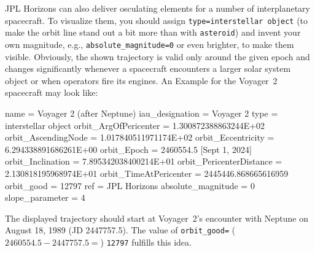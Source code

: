 \noindent JPL Horizons can also deliver osculating elements for a number of interplanetary spacecraft. 
To visualize them, you should assign \texttt{type=interstellar object} 
(to make the orbit line stand out a bit more than with \texttt{asteroid}) 
and invent your own magnitude, e.g., \texttt{absolute\_magnitude=0} or even brighter, to make them visible. 
Obviously, the shown trajectory is valid only around the given epoch and changes significantly whenever a spacecraft 
encounters a larger solar system object or when operators fire its engines. An Example for the Voyager~2 spacecraft may look like:

\begin{configfile}[\scriptsize]
[voyager2]
name                           = Voyager 2 (after Neptune)
iau_designation                = Voyager 2
type                           = interstellar object
orbit_ArgOfPericenter          = 1.300872388863244E+02
orbit_AscendingNode            = 1.017840511971174E+02
orbit_Eccentricity             = 6.294338891686261E+00
orbit_Epoch                    = 2460554.5               [Sept 1, 2024]
orbit_Inclination              = 7.895342038400214E+01
orbit_PericenterDistance       = 2.130818195968974E+01
orbit_TimeAtPericenter         = 2445446.868665616959
orbit_good                     = 12797
ref                            = JPL Horizons 
absolute_magnitude             = 0
slope_parameter                = 4
\end{configfile}

\noindent The displayed trajectory should start at Voyager~2's encounter with Neptune on August 18, 1989 (JD 2447757.5). 
The value of \texttt{orbit\_good=} ($2460554.5-2447757.5 = $) \texttt{12797} fulfills this idea. 



